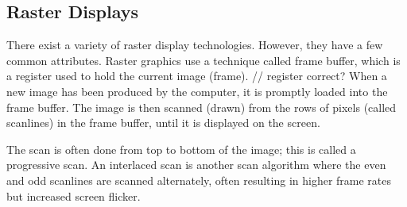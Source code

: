 \subsection{Raster Displays}
There exist a variety of raster display technologies.
However, they have a few common attributes.
Raster graphics use a technique called frame buffer, which is a register used to hold the current image (frame). // register correct?
When a new image has been produced by the computer, it is promptly loaded into the frame buffer.
The image is then scanned (drawn) from the rows of pixels (called scanlines) in the frame buffer, until it is displayed on the screen.

The scan is often done from top to bottom of the image; this is called a progressive scan.
An interlaced scan is another scan algorithm where the even and odd scanlines are scanned alternately, often resulting in higher frame rates but increased screen flicker.